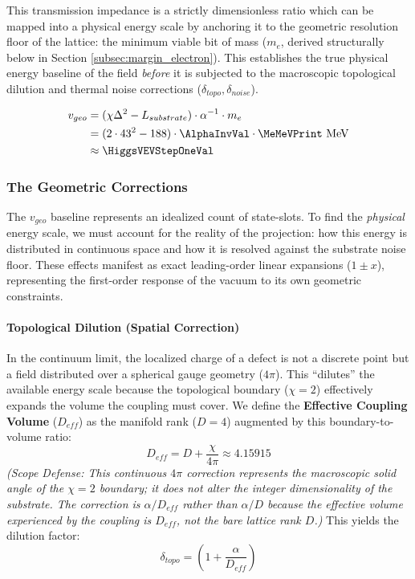 This transmission impedance is a strictly dimensionless ratio which can be mapped into a physical energy scale by anchoring it to the geometric resolution floor of the lattice: the minimum viable bit of mass ($m_e$, derived structurally below in Section \ref{subsec:margin_electron}). This establishes the true physical energy baseline of the field \textit{before} it is subjected to the macroscopic topological dilution and thermal noise corrections ($\delta_{topo}, \delta_{noise}$).

\begin{equation}
\begin{split}
v_{geo} &= (\chi \Delta^2 - L_{substrate}) \cdot \alpha^{-1} \cdot m_e \\
&= (2 \cdot 43^2 - 188) \cdot \AlphaInvVal \cdot \MeMeVPrint \text{ MeV} \\
&\approx \HiggsVEVStepOneVal
\end{split}
\end{equation}

\subsubsection{The Geometric Corrections}
The $v_{geo}$ baseline represents an idealized count of state-slots. To find the \textit{physical} energy scale, we must account for the reality of the projection: how this energy is distributed in continuous space and how it is resolved against the substrate noise floor. These effects manifest as exact leading-order linear expansions ($1 \pm x$), representing the first-order response of the vacuum to its own geometric constraints.

\paragraph{Topological Dilution (Spatial Correction)}
In the continuum limit, the localized charge of a defect is not a discrete point but a field distributed over a spherical gauge geometry ($4\pi$). This ``dilutes'' the available energy scale because the topological boundary ($\chi=2$) effectively expands the volume the coupling must cover. We define the \textbf{Effective Coupling Volume} ($D_{eff}$) as the manifold rank ($D=4$) augmented by this boundary-to-volume ratio:
\begin{equation}
D_{eff} = D + \frac{\chi}{4\pi} \approx 4.15915
\end{equation}
\textit{(Scope Defense: This continuous $4\pi$ correction represents the macroscopic solid angle of the $\chi=2$ boundary; it does not alter the integer dimensionality of the substrate. The correction is $\alpha/D_{eff}$ rather than $\alpha/D$ because the effective volume experienced by the coupling is $D_{eff}$, not the bare lattice rank $D$.)} This yields the dilution factor:
\begin{equation}
\delta_{topo} = \left( 1 + \frac{\alpha}{D_{eff}} \right)
\end{equation}

